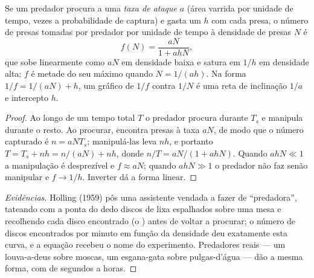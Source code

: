 \begin{theorem}\label{thm:b1:species-interactions:holling}
Se um predador procura a uma \emph{taxa de ataque} $a$ (área varrida
por unidade de tempo, vezes a probabilidade de captura) e gasta um
 $h$ com cada presa, o número de presas tomadas
por predador por unidade de tempo à densidade de presas $N$ é
\[
f(N) = \frac{aN}{1 + ahN} ,
\]
que sobe linearmente como $aN$ em densidade baixa e satura em $1/h$ em
densidade alta; $f$ é metade do seu máximo quando $N = 1/(ah)$. Na
forma $1/f = 1/(aN) + h$, um gráfico de $1/f$ contra $1/N$ é uma reta
de inclinação $1/a$ e intercepto $h$.
\end{theorem}
\begin{proof}
Ao longo de um tempo total $T$ o predador procura durante $T_s$ e
manipula durante o resto. Ao procurar, encontra presas à taxa $aN$, de
modo que o número capturado é $n = aN T_s$; manipulá-las leva $nh$, e
portanto $T = T_s + nh =
n/(aN) + nh$, donde $n/T = aN/(1 + ahN)$. Quando $ahN \ll 1$ a
manipulação é desprezível e $f \approx aN$; quando $ahN \gg 1$ o
predador não faz senão manipular e $f \to 1/h$. Inverter dá a forma
linear.
\end{proof}
\begin{proof}[Evidências]
Holling (1959) pôs uma assistente vendada a fazer de ``predadora'',
tateando com a ponta do dedo discos de lixa espalhados sobre uma mesa
e recolhendo cada disco encontrado (o ) antes de
voltar a procurar; o número de discos encontrados por minuto em função
da densidade deu exatamente esta curva, e a equação recebeu o nome do
experimento. Predadores reais --- um louva-a-deus sobre moscas, um
esgana-gata sobre pulgas-d'água --- dão a mesma forma, com  de segundos a horas.
\end{proof}

